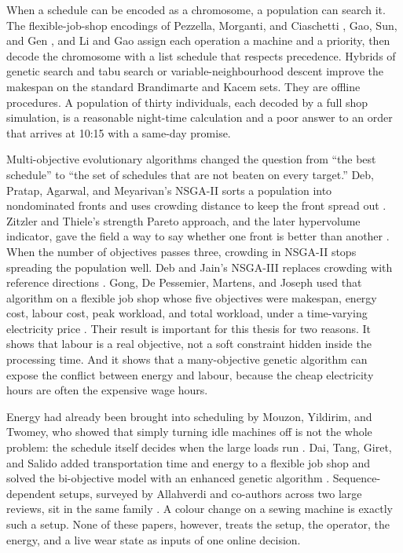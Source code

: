 When a schedule can be encoded as a chromosome, a population can search it. The flexible-job-shop encodings of Pezzella, Morganti, and Ciaschetti \cite{pezzella2008}, Gao, Sun, and Gen \cite{gao2008}, and Li and Gao \cite{li2016} assign each operation a machine and a priority, then decode the chromosome with a list schedule that respects precedence. Hybrids of genetic search and tabu search or variable-neighbourhood descent improve the makespan on the standard Brandimarte and Kacem sets. They are offline procedures. A population of thirty individuals, each decoded by a full shop simulation, is a reasonable night-time calculation and a poor answer to an order that arrives at 10:15 with a same-day promise.

Multi-objective evolutionary algorithms changed the question from ``the best schedule'' to ``the set of schedules that are not beaten on every target.'' Deb, Pratap, Agarwal, and Meyarivan's NSGA-II sorts a population into nondominated fronts and uses crowding distance to keep the front spread out \cite{deb2002}. Zitzler and Thiele's strength Pareto approach, and the later hypervolume indicator, gave the field a way to say whether one front is better than another \cite{zitzler1999,zitzler2003}. When the number of objectives passes three, crowding in NSGA-II stops spreading the population well. Deb and Jain's NSGA-III replaces crowding with reference directions \cite{deb2014}. Gong, De Pessemier, Martens, and Joseph used that algorithm on a flexible job shop whose five objectives were makespan, energy cost, labour cost, peak workload, and total workload, under a time-varying electricity price \cite{gong2019}. Their result is important for this thesis for two reasons. It shows that labour is a real objective, not a soft constraint hidden inside the processing time. And it shows that a many-objective genetic algorithm can expose the conflict between energy and labour, because the cheap electricity hours are often the expensive wage hours.

Energy had already been brought into scheduling by Mouzon, Yildirim, and Twomey, who showed that simply turning idle machines off is not the whole problem: the schedule itself decides when the large loads run \cite{mouzon2007}. Dai, Tang, Giret, and Salido added transportation time and energy to a flexible job shop and solved the bi-objective model with an enhanced genetic algorithm \cite{dai2019}. Sequence-dependent setups, surveyed by Allahverdi and co-authors across two large reviews, sit in the same family \cite{allahverdi2008,allahverdi2015}. A colour change on a sewing machine is exactly such a setup. None of these papers, however, treats the setup, the operator, the energy, and a live wear state as inputs of one online decision.

